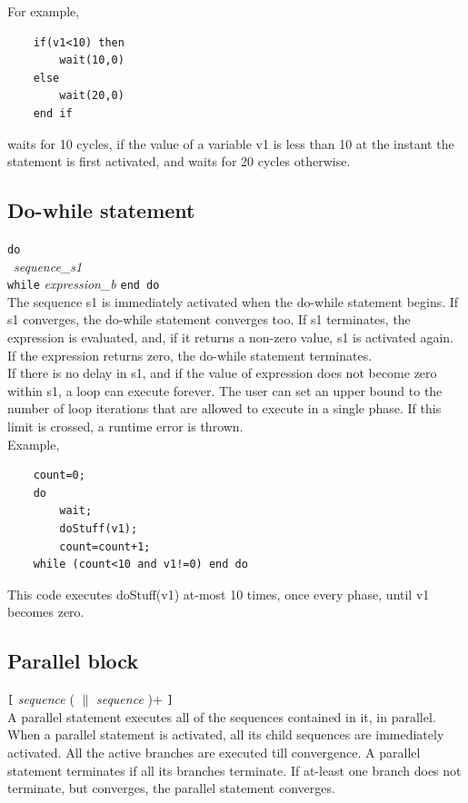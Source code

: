 \documentclass[12pt,a4paper]{report}
\begin{document}
	For example,
	\begin{verbatim}
	if(v1<10) then
		wait(10,0)
	else
		wait(20,0)
	end if
	\end{verbatim}
	waits for 10 cycles, if the value of a variable 
	v1 is less than 10 at the instant the statement 
	is first activated, and waits for 20 cycles 
	otherwise.

	\subsection{Do-while statement}
		\texttt{do}\\
		\ \textit{sequence\_s1}\\
		\texttt{while} \textit{expression\_b} \texttt{end do}\\

	The sequence s1 is immediately activated when the do-while statement begins.
	If s1 converges, the do-while statement converges too. If s1 terminates, the expression is evaluated,
	and, if it returns a non-zero value, s1 is activated again. If the expression returns zero, 
	the do-while statement terminates.\\

	If there is no delay in s1, and if the value of expression does not become zero within s1,
	a loop can execute forever. The user can set an upper bound to the number of loop iterations
	that are allowed to execute in a single phase. If this limit is crossed, a runtime error is thrown.\\

	Example,

	\begin{verbatim}
	count=0;
	do
		wait;
		doStuff(v1);
		count=count+1;        
	while (count<10 and v1!=0) end do
	\end{verbatim}

	This code executes doStuff(v1) at-most 10 times, once every phase, 
	until v1 becomes zero.


	\subsection{Parallel block}
		\texttt{[} \textit{sequence} ( \texttt{$\parallel$} \textit{sequence} )+ \texttt{]}\\

	A parallel statement executes all of the sequences contained in it, in parallel.\\

	When a parallel statement is activated, all its child sequences are immediately activated.
	All the active branches are executed till convergence. 
	A parallel statement terminates if all its branches terminate.
	If at-least one branch does not terminate, but converges, 
	the parallel statement converges.\\
\end{document}
